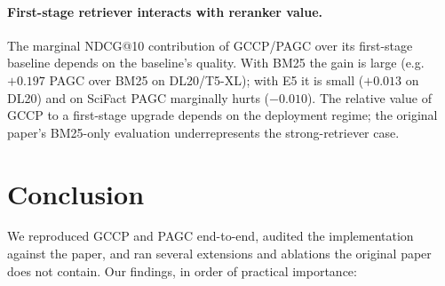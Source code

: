 \documentclass[sigconf]{acmart}
\begin{document}
\paragraph{First-stage retriever interacts with reranker value.}
The marginal NDCG@10 contribution of GCCP/PAGC over its first-stage
baseline depends on the baseline's quality. With BM25 the gain is
large (e.g.\ $+0.197$ PAGC over BM25 on DL20/T5-XL); with E5 it is
small ($+0.013$ on DL20) and on SciFact PAGC marginally hurts
($-0.010$). The relative value of GCCP to a first-stage upgrade
depends on the deployment regime; the original paper's BM25-only
evaluation underrepresents the strong-retriever case.

\section{Conclusion}

We reproduced GCCP and PAGC end-to-end, audited the implementation
against the paper, and ran several extensions and ablations the
original paper does not contain. Our findings, in order of
practical importance:
\end{document}
